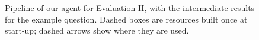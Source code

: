 \documentclass{article}
\begin{document}
\begin{figure}[p]
    \centering
    
    \caption{Pipeline of our agent for Evaluation II, with the intermediate results for the example question.
    Dashed boxes are resources built once at start-up; dashed arrows show where they are used.}
    \label{fig:pipeline}
\end{figure}



\end{document}

